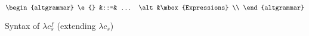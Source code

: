 \begin{figure*}
$$
\begin{altgrammar}
  \e{} &::=& ... \alt &\mbox{Expressions} \\
\end{altgrammar}
$$
\caption{Syntax of $\lambda c_s^f$ (extending $\lambda c_s$)}
\end{figure*}
